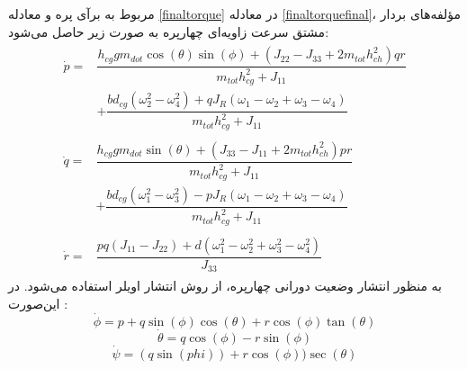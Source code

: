 مربوط به برآی پره و معادله 
\ref{finaltorque}
در معادله 
\ref{finaltorquefinal}،
مؤلفه‌های بردار مشتق سرعت زاویه‌ای چهارپره به صورت زیر حاصل می‌شود:
\begin{align}
	\begin{split}
		\dot{p} =& \dfrac{h_{cg}gm_{dot}\cos(\theta)\sin(\phi)
			+\left(J_{22} - J_{33} +2m_{tot}h_{ch}^2\right)qr
		}
		{m_{tot}h_{cg}^2 + J_{11}} \\
		&+\dfrac{bd_{cg}\left(\omega_2^2-\omega_4^2\right) + qJ_R(\omega_1-\omega_2+\omega_3-\omega_4)}
		{m_{tot}h_{cg}^2 + J_{11}}
	\end{split}\\[1em]
		\begin{split}
		\dot{q} =& \dfrac{h_{cg}gm_{dot}\sin(\theta)
			+\left(J_{33} - J_{11} +2m_{tot}h_{ch}^2\right)pr
		}
		{m_{tot}h_{cg}^2 + J_{11}} \\
		&+\dfrac{bd_{cg}\left(\omega_1^2-\omega_3^2\right) - pJ_R(\omega_1-\omega_2+\omega_3-\omega_4)}
		{m_{tot}h_{cg}^2 + J_{11}}
	\end{split}\\[1em]
	\begin{split}
		\dot{r} =& \dfrac{pq(J_{11}-J_{22})
		+ d(\omega_1^2-\omega_2^2+\omega_3^2-\omega_4^2)
	}{J_{33}}
	\end{split}
\end{align}
به منظور انتشار وضعیت دورانی چهارپره، از روش انتشار اویلر استفاده می‌شود. در این‌صورت
\cite{zipfel2000modeling}
:
$$\dot\phi = p + q\sin(\phi)\cos(\theta) +‌
r\cos(\phi)\tan(\theta)
$$
$$
\dot \theta = q\cos(\phi) - r\sin(\phi)
$$
$$
\dot\psi = (q\sin(phi)) + r\cos(\phi))\sec(\theta) 
$$


